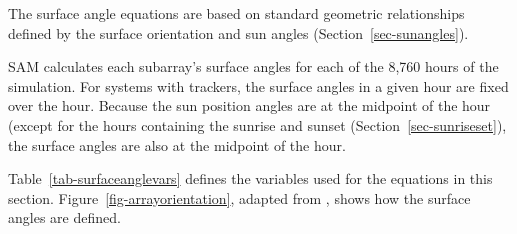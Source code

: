 \documentclass[12pt,letterpaper]{article}
\begin{document}
The surface angle equations are based on standard geometric relationships defined by the surface orientation and sun angles (Section~\ref{sec-sunangles}).

SAM calculates each subarray's surface angles for each of the 8,760 hours of the simulation. For systems with trackers, the surface angles in a given hour are fixed over the hour. Because the sun position angles are at the midpoint of the hour (except for the hours containing the sunrise and sunset (Section~\ref{sec-sunriseset}), the surface angles are also at the midpoint of the hour.

Table~\ref{tab-surfaceanglevars} defines the variables used for the equations in this section. Figure~\ref{fig-arrayorientation}, adapted from \citet{dunlap2007}, shows how the surface angles are defined.

\end{document}
